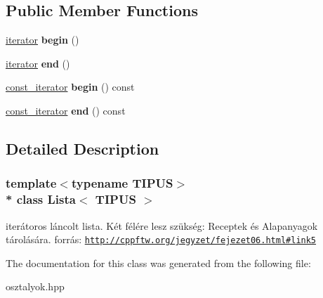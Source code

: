 \subsection*{Public Member Functions}
\begin{DoxyCompactItemize}
\item 
\hyperlink{class_lista_1_1iterator}{iterator} {\bfseries begin} ()\hypertarget{class_lista_ac32b6933b5c76f89b7f5f8f44690a3d0}{}\label{class_lista_ac32b6933b5c76f89b7f5f8f44690a3d0}

\item 
\hyperlink{class_lista_1_1iterator}{iterator} {\bfseries end} ()\hypertarget{class_lista_ae8ce80dee0b50fbb37fe097af7a333df}{}\label{class_lista_ae8ce80dee0b50fbb37fe097af7a333df}

\item 
\hyperlink{class_lista_1_1const__iterator}{const\+\_\+iterator} {\bfseries begin} () const \hypertarget{class_lista_a5de2207b484332b1c359bb753c894cc1}{}\label{class_lista_a5de2207b484332b1c359bb753c894cc1}

\item 
\hyperlink{class_lista_1_1const__iterator}{const\+\_\+iterator} {\bfseries end} () const \hypertarget{class_lista_ac277630e720e2f2a7519cc018b497773}{}\label{class_lista_ac277630e720e2f2a7519cc018b497773}

\end{DoxyCompactItemize}


\subsection{Detailed Description}
\subsubsection*{template$<$typename T\+I\+P\+US$>$\\*
class Lista$<$ T\+I\+P\+U\+S $>$}

iterátoros láncolt lista. Két félére lesz szükség\+: Receptek és Alapanyagok tárolására. forrás\+: \href{http://cppftw.org/jegyzet/fejezet06.html#link5}{\tt http\+://cppftw.\+org/jegyzet/fejezet06.\+html\#link5} 

The documentation for this class was generated from the following file\+:\begin{DoxyCompactItemize}
\item 
osztalyok.\+hpp\end{DoxyCompactItemize}

